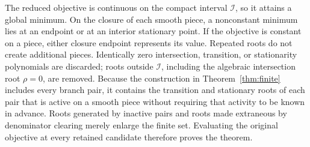 \documentclass[11pt]{article}
\theoremstyle{definition}
\begin{document}
The reduced objective is continuous on the compact interval $\mathcal I$, so
it attains a global minimum. On the closure of each smooth piece, a
nonconstant minimum lies at an endpoint or at an interior stationary point.
If the objective is constant on a piece, either closure endpoint represents
its value. Repeated roots do not create additional pieces. Identically zero
intersection, transition, or stationarity polynomials are discarded; roots
outside $\mathcal I$, including the algebraic intersection root $\rho=0$, are
removed. Because the construction in Theorem~\ref{thm:finite} includes every
branch pair, it contains the transition and stationary roots of each pair that
is active on a smooth piece without requiring that activity to be known in
advance. Roots generated by inactive pairs and roots made extraneous by
denominator clearing merely enlarge the finite set. Evaluating the original
objective at every retained candidate therefore proves the theorem.



\end{document}
